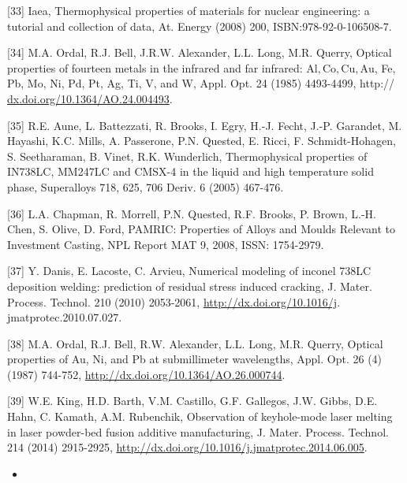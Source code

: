 \documentclass[10pt]{article}
\begin{document}
[33] Iaea, Thermophysical properties of materials for nuclear engineering: a tutorial and collection of data, At. Energy (2008) 200, ISBN:978-92-0-106508-7.

[34] M.A. Ordal, R.J. Bell, J.R.W. Alexander, L.L. Long, M.R. Querry, Optical properties of fourteen metals in the infrared and far infrared: $\mathrm{Al}, \mathrm{Co}, \mathrm{Cu}, \mathrm{Au}$, Fe, Pb, Mo, Ni, Pd, Pt, Ag, Ti, V, and W, Appl. Opt. 24 (1985) 4493-4499, http:// \href{http://dx.doi.org/10.1364/AO.24.004493}{dx.doi.org/10.1364/AO.24.004493}.

[35] R.E. Aune, L. Battezzati, R. Brooks, I. Egry, H.-J. Fecht, J.-P. Garandet, M. Hayashi, K.C. Mills, A. Passerone, P.N. Quested, E. Ricci, F. Schmidt-Hohagen, S. Seetharaman, B. Vinet, R.K. Wunderlich, Thermophysical properties of IN738LC, MM247LC and CMSX-4 in the liquid and high temperature solid phase, Superalloys 718, 625, 706 Deriv. 6 (2005) 467-476.

[36] L.A. Chapman, R. Morrell, P.N. Quested, R.F. Brooks, P. Brown, L.-H. Chen, S. Olive, D. Ford, PAMRIC: Properties of Alloys and Moulds Relevant to Investment Casting, NPL Report MAT 9, 2008, ISSN: 1754-2979.

[37] Y. Danis, E. Lacoste, C. Arvieu, Numerical modeling of inconel 738LC deposition welding: prediction of residual stress induced cracking, J. Mater. Process. Technol. 210 (2010) 2053-2061, \href{http://dx.doi.org/10.1016/j}{http://dx.doi.org/10.1016/j}. jmatprotec.2010.07.027.

[38] M.A. Ordal, R.J. Bell, R.W. Alexander, L.L. Long, M.R. Querry, Optical properties of Au, Ni, and Pb at submillimeter wavelengths, Appl. Opt. 26 (4) (1987) 744-752, \href{http://dx.doi.org/10.1364/AO.26.000744}{http://dx.doi.org/10.1364/AO.26.000744}.

[39] W.E. King, H.D. Barth, V.M. Castillo, G.F. Gallegos, J.W. Gibbs, D.E. Hahn, C. Kamath, A.M. Rubenchik, Observation of keyhole-mode laser melting in laser powder-bed fusion additive manufacturing, J. Mater. Process. Technol. 214 (2014) 2915-2925, \href{http://dx.doi.org/10.1016/j.jmatprotec.2014.06.005}{http://dx.doi.org/10.1016/j.jmatprotec.2014.06.005}.

\begin{itemize}
  \item 
\end{itemize}
\end{document}
